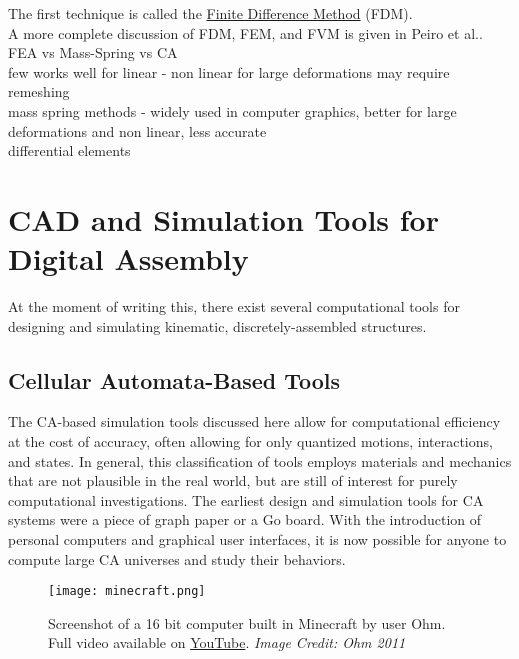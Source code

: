 {The first technique is called the \href{https://en.wikipedia.org/wiki/Finite_difference_method}{Finite Difference Method} (FDM).  \\


A more complete discussion of FDM, FEM, and FVM is given in Peiro et al.\cite{Peiro2005}.\\

FEA vs Mass-Spring vs CA\\
few works well for linear - non linear for large deformations may require remeshing\\
mass spring methods - widely used in computer graphics, better for large deformations and non linear, less accurate\\
differential elements\\


\section{CAD and Simulation Tools for Digital Assembly}

At the moment of writing this, there exist several computational tools for designing and simulating kinematic, discretely-assembled structures.

\subsection{Cellular Automata-Based Tools}

The CA-based simulation tools discussed here allow for computational efficiency at the cost of accuracy, often allowing for only quantized motions, interactions, and states.  In general, this classification of tools employs materials and mechanics that are not plausible in the real world, but are still of interest for purely computational investigations.  The earliest design and simulation tools for CA systems were a piece of graph paper or a Go board\cite{Gardner1970}.  With the introduction of personal computers and graphical user interfaces, it is now possible for anyone to compute large CA universes and study their behaviors.\\

\begin{figure}
  \texttt{[image: minecraft.png]}
  \caption{Screenshot of a 16 bit computer built in Minecraft by user Ohm.  Full video available on \href{https://www.youtube.com/watch?v=KzrFzkb3A4o}{YouTube}. \textit{Image Credit: Ohm 2011}}
  \label{fig:minecraft}
\end{figure}

}
